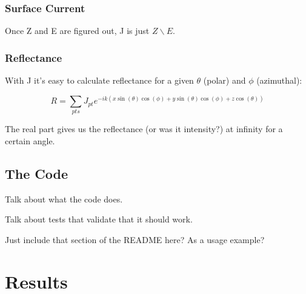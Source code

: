 \documentclass[etd,oneside,senior]{BYUPhys}
\begin{document}
\subsection{Surface Current}

Once Z and E are figured out, J is just $Z\backslash E$.



\subsection{Reflectance}
With J it's easy to calculate reflectance for a given $\theta$ (polar) and $\phi$ (azimuthal):

\begin{equation}
  R=\sum_{pts}J_{pt}e^{-ik\left(x\sin\left(\theta\right)\cos\left(\phi\right)+y\sin\left(\theta\right)\cos\left(\phi\right)+z\cos\left(\theta\right)\right)}
\end{equation}

The real part gives us the reflectance (or was it intensity?) at infinity for a certain angle.







\section{The Code}\label{chap:code} %

Talk about what the code does.

Talk about tests that validate that it should work.

Just include that section of the README here? As a usage example?







\chapter{Results}\label{chap:results}
\end{document}
